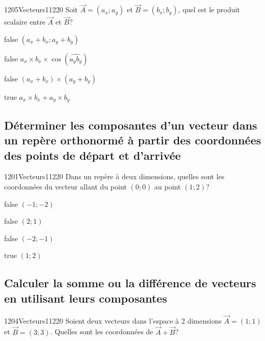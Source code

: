 \documentclass[11pt]{article}
\begin{document}
			
        	\begin{question}{1205}{Vecteurs}{1}{1220}
				Soit $\vec{A}=(a_x;a_y)$ et $\vec{B}=(b_x;b_y)$, quel est le produit scalaire entre $\vec{A}$ et $\vec{B}$?
            \end{question}

            \begin{reponses}
            	\item[false] $(a_x+b_x;a_y+b_y)$
            	\item[false] $a_x\times b_x\times \cos(\widehat{a_y b_y})$
                \item[false] $(a_x+b_x)\times (a_y+b_y)$
                \item[true] $a_x\times b_x+a_y\times b_y$
            \end{reponses}
		
        \subsection{Déterminer les composantes d'un vecteur dans un repère orthonormé à partir des coordonnées des points de départ et d'arrivée}
        
        	\begin{question}{1201}{Vecteurs}{1}{1220}
				Dans un repère à deux dimensions, quelles sont les coordonnées du vecteur allant du point $(0;0)$ au point $(1;2)$?
            \end{question}

            \begin{reponses}
            	\item[false] $(-1;-2)$
            	\item[false] $(2;1)$
                \item[false] $(-2;-1)$
                \item[true] $(1;2)$
            \end{reponses}

        \subsection{Calculer la somme ou la différence de vecteurs en utilisant leurs composantes}
        
        	\begin{question}{1204}{Vecteurs}{1}{1220}
            	Soient deux vecteurs dans l'espace à 2 dimensions $\vec{A}=(1;1)$ et $\vec{B}=(3;3)$. Quelles sont les coordonnées de $\vec{A}+\vec{B}$?
            \end{question}
\end{document}
